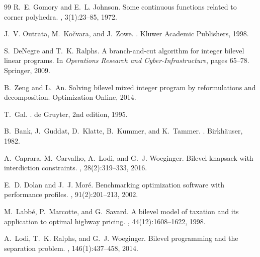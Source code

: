\documentclass[11pt]{article}
\begin{document}
\begin{thebibliography}{99}
R.~E. Gomory and E.~L. Johnson.
\newblock Some continuous functions related to corner polyhedra.
, 3(1):23--85, 1972.

J.~V. Outrata, M.~Ko\v{c}vara, and J.~Zowe.
.
\newblock Kluwer Academic Publishers, 1998.

S.~DeNegre and T.~K. Ralphs.
\newblock A branch-and-cut algorithm for integer bilevel linear programs.
\newblock In {\em Operations Research and Cyber-Infrastructure},
  pages 65--78. Springer, 2009.

B.~Zeng and L.~An.
\newblock Solving bilevel mixed integer program by reformulations and
  decomposition.
\newblock Optimization Online, 2014.

T.~Gal.
.
\newblock de Gruyter, 2nd edition, 1995.

B.~Bank, J.~Guddat, D.~Klatte, B.~Kummer, and K.~Tammer.
.
\newblock Birkh\"auser, 1982.

A.~Caprara, M.~Carvalho, A.~Lodi, and G.~J. Woeginger.
\newblock Bilevel knapsack with interdiction constraints.
, 28(2):319--333, 2016.

E.~D. Dolan and J.~J. Mor{\'e}.
\newblock Benchmarking optimization software with performance profiles.
, 91(2):201--213, 2002.

M.~Labb{\'e}, P.~Marcotte, and G.~Savard.
\newblock A bilevel model of taxation and its application to optimal highway
  pricing.
, 44(12):1608--1622, 1998.

A.~Lodi, T.~K. Ralphs, and G.~J. Woeginger.
\newblock Bilevel programming and the separation problem.
, 146(1):437--458, 2014.

\end{thebibliography}
\end{document}
